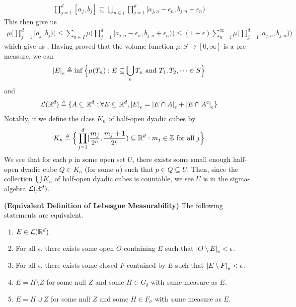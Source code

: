 \documentclass{report}
\begin{document}
\begin{mdframed}
\begin{align*}
\prod_{j=1}^d [a_j,b_j]\subseteq \bigcup_{n \in I} \prod_{j=1}^d [a_{j,n}-\epsilon _n, b_{j,n}+\epsilon _n)
\end{align*}
This then give us 
\begin{align*}
\mu \Big(\prod_{j=1}^d [a_j,b_j)\Big)\leq \sum_{n \in I}\mu \Big(\prod_{j=1}^d [a_{j,n}-\epsilon _n, b_{j,n}+\epsilon _n) \Big) \leq (1+\epsilon )\sum_{n=1}^{\infty} \mu \Big(\prod_{j=1}^d [a_{j,n},b_{j,n}) \Big)
\end{align*}
which give us . Having proved that the volume function $\mu : S\rightarrow [0,\infty]$ is a pre-measure, we can 
\begin{align*}
\left|E\right|_e \triangleq \inf \Big\{  \mu (T_n) : E \subseteq \bigcup_ n T_n \text{ and }T_1,T_2,\dots  \in S \Big\}
\end{align*}
and  
\begin{align*}
\mathcal{L}(\mathbb{R}^d)\triangleq \{ A \subseteq \mathbb{R}^d: \forall E \subseteq \mathbb{R}^d, \left|E\right|_e= \left|E\cap A\right|_e + \left|E\cap A^c\right|_e \}
\end{align*}
Notably, if we define the class $K_n$ of half-open dyadic cubes by 
\begin{align*}
K_n \triangleq \Big\{ \prod_{j=1}^{d} [\frac{m_j}{2^n}, \frac{m_j+1}{2^n})\subseteq \mathbb{R}^d: m_j \in\mathbb{Z} \text{ for all }j \Big\}
\end{align*}
We see that for each $p$ in some open set $U$, there exists some small enough half-open dyadic cube $Q\in K_n$ (for some $n$) such that $p \in Q \subseteq U$. Then, since the collection $\bigcup K_n$ of half-open dyadic cubes is countable, we see $U$ is in the sigma-algebra  $\mathcal{L}(\mathbb{R}^d)$. 
\end{mdframed}
\begin{theorem}
\textbf{(Equivalent Definition of Lebesgue Measurability)} The following statements are equivalent. 
\begin{enumerate}[label=(\alph*)]
  \item $E\in \mathcal{L}(\mathbb{R}^d)$. 
  \item For all $\epsilon $, there exists some open $O$ containing $E$ such that  $\left|O\setminus E\right|_e< \epsilon $. 
  \item For all $\epsilon $, there exists some closed $F$ contained by $E$ such that $\left|E\setminus F\right|_e<\epsilon $. 
  \item $E= H \setminus Z$ for some null $Z$ and some $H \in G_\delta$ with same measure as  $E$. 
  \item $E=H \cup Z$ for some null $Z$ and some $H\in F_\sigma$ with same measure as $E$. 
\end{enumerate}
\end{theorem}
\end{document}
